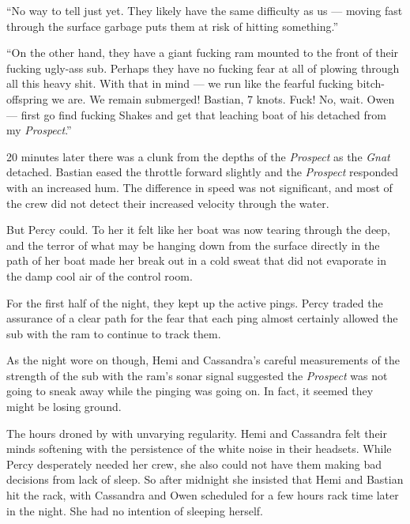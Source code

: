 \documentclass[
]{scrbook}
\begin{document}
``No way to tell just yet. They likely have the same difficulty as us
--- moving fast through the surface garbage puts them at risk of hitting
something.''

``On the other hand, they have a giant fucking ram mounted to the front
of their fucking ugly-ass sub. Perhaps they have no fucking fear at all
of plowing through all this heavy shit. With that in mind --- we run
like the fearful fucking bitch-offspring we are. We remain submerged!
Bastian, 7 knots. Fuck! No, wait. Owen --- first go find fucking Shakes
and get that leaching boat of his detached from my \emph{Prospect}.''

20 minutes later there was a clunk from the depths of the
\emph{Prospect} as the \emph{Gnat} detached. Bastian eased the throttle
forward slightly and the \emph{Prospect} responded with an increased
hum. The difference in speed was not significant, and most of the crew
did not detect their increased velocity through the water.

But Percy could. To her it felt like her boat was now tearing through
the deep, and the terror of what may be hanging down from the surface
directly in the path of her boat made her break out in a cold sweat that
did not evaporate in the damp cool air of the control room.

For the first half of the night, they kept up the active pings. Percy
traded the assurance of a clear path for the fear that each ping almost
certainly allowed the sub with the ram to continue to track them.

As the night wore on though, Hemi and Cassandra's careful measurements
of the strength of the sub with the ram's sonar signal suggested the
\emph{Prospect} was not going to sneak away while the pinging was going
on. In fact, it seemed they might be losing ground.

The hours droned by with unvarying regularity. Hemi and Cassandra felt
their minds softening with the persistence of the white noise in their
headsets. While Percy desperately needed her crew, she also could not
have them making bad decisions from lack of sleep. So after midnight she
insisted that Hemi and Bastian hit the rack, with Cassandra and Owen
scheduled for a few hours rack time later in the night. She had no
intention of sleeping herself.
\end{document}
